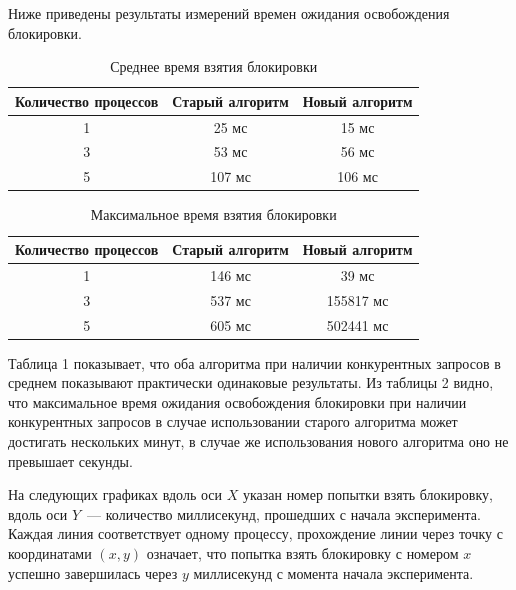 Ниже приведены результаты измерений времен ожидания освобождения блокировки.

\begin{table}[H]
\caption{\label{tab:summary}Среднее время взятия блокировки}
\begin{center}
\begin{tabular}{|c|c|c|}
\hline
Количество процессов & Старый алгоритм & Новый алгоритм \\
\hline
1 & 25 мс & 15 мс \\
\hline
3 & 53 мс & 56 мс \\
\hline
5 & 107 мс & 106 мс \\
\hline
\end{tabular}
\end{center}

\end{table} \begin{table}[H]
\caption{\label{tab:summary}Максимальное время взятия блокировки}
\begin{center}
\begin{tabular}{|c|c|c|}
\hline
Количество процессов & Старый алгоритм & Новый алгоритм \\
\hline
1 & 146 мс & 39 мс \\
\hline
3 & 537 мс & 155817 мс \\
\hline
5 & 605 мс & 502441 мс \\
\hline
\end{tabular}
\end{center}
\end{table} 

Таблица 1 показывает, что оба алгоритма при наличии конкурентных запросов в среднем показывают практически одинаковые результаты.
Из таблицы 2 видно, что максимальное время ожидания освобождения блокировки при наличии конкурентных запросов в случае использовании старого алгоритма может достигать нескольких минут, в случае же использования нового алгоритма оно не превышает секунды.

На следующих графиках вдоль оси $X$ указан номер попытки взять блокировку, вдоль оси $Y$~--- количество миллисекунд, прошедших с начала эксперимента. Каждая линия соответствует одному процессу, прохождение линии через точку с координатами $(x, y)$ означает, что попытка взять блокировку с номером $x$ успешно завершилась через $y$ миллисекунд с момента начала эксперимента.

